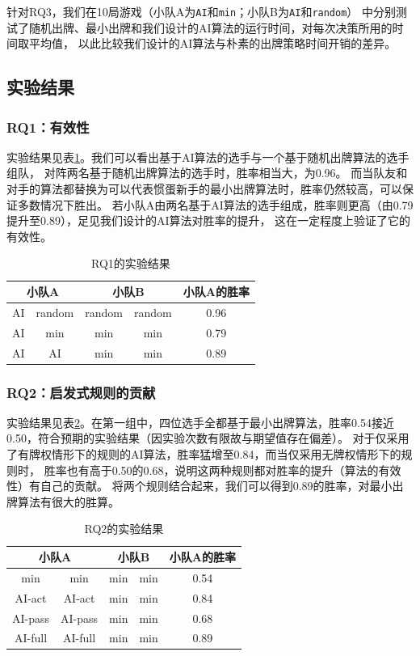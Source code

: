 \documentclass[a4paper]{ctexart}
\begin{document}
针对RQ3，我们在10局游戏（小队A为\texttt{AI}和\texttt{min}；小队B为\texttt{AI}和\texttt{random}）
中分别测试了随机出牌、最小出牌和我们设计的AI算法的运行时间，对每次决策所用的时间取平均值，
以此比较我们设计的AI算法与朴素的出牌策略时间开销的差异。

\subsection{实验结果}

\subsubsection{RQ1：有效性}

实验结果见表\ref{RQ1_result}。我们可以看出基于AI算法的选手与一个基于随机出牌算法的选手组队，
对阵两名基于随机出牌算法的选手时，胜率相当大，为0.96。
而当队友和对手的算法都替换为可以代表惯蛋新手的最小出牌算法时，胜率仍然较高，可以保证多数情况下胜出。
若小队A由两名基于AI算法的选手组成，胜率则更高（由0.79提升至0.89），足见我们设计的AI算法对胜率的提升，
这在一定程度上验证了它的有效性。

\begin{table}
	\centering 
	\caption{RQ1的实验结果}
	\label{RQ1_result}
	\begin{tabular}{|c|c|c|c|c|}
		\hline
		\multicolumn{2}{|c|}{小队A} & \multicolumn{2}{c|}{小队B} & 小队A的胜率\\ \hline
		AI & random & random & random & 0.96 \\ \hline
		AI & min & min & min & 0.79 \\ \hline
		AI & AI & min & min & 0.89 \\ \hline
	\end{tabular}
\end{table}

\subsubsection{RQ2：启发式规则的贡献}

实验结果见表\ref{RQ2_result}。在第一组中，四位选手全都基于最小出牌算法，胜率0.54接近0.50，符合预期的实验结果（因实验次数有限故与期望值存在偏差）。
对于仅采用了有牌权情形下的规则的AI算法，胜率猛增至0.84，而当仅采用无牌权情形下的规则时，
胜率也有高于0.50的0.68，说明这两种规则都对胜率的提升（算法的有效性）有自己的贡献。
将两个规则结合起来，我们可以得到0.89的胜率，对最小出牌算法有很大的胜算。

\begin{table}
	\centering 
	\caption{RQ2的实验结果}
	\label{RQ2_result}
	\begin{tabular}{|c|c|c|c|c|}
		\hline
		\multicolumn{2}{|c|}{小队A} & \multicolumn{2}{c|}{小队B} & 小队A的胜率 \\ \hline
		min & min & min & min & 0.54 \\ \hline
		AI-act  & AI-act & min & min & 0.84 \\ \hline
		AI-pass & AI-pass & min & min & 0.68 \\ \hline
		AI-full & AI-full & min & min & 0.89 \\ \hline
	\end{tabular}
\end{table}
\end{document}
